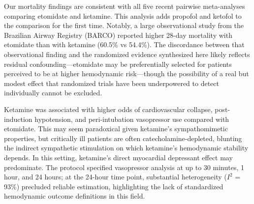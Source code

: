 \documentclass[11pt]{article}
\begin{document}
Our mortality findings are consistent with all five recent pairwise meta-analyses comparing etomidate and ketamine.\cite{kotani2023,koroki2024,greer2025,daghmouri2025,demorais2025} This analysis adds propofol and ketofol to the comparison for the first time. Notably, a large observational study from the Brazilian Airway Registry (BARCO) reported higher 28-day mortality with etomidate than with ketamine (60.5\% vs 54.4\%).\cite{maia2025} The discordance between that observational finding and the randomized evidence synthesized here likely reflects residual confounding---etomidate may be preferentially selected for patients perceived to be at higher hemodynamic risk---though the possibility of a real but modest effect that randomized trials have been underpowered to detect individually cannot be excluded.

Ketamine was associated with higher odds of cardiovascular collapse, post-induction hypotension, and peri-intubation vasopressor use compared with etomidate. This may seem paradoxical given ketamine's sympathomimetic properties, but critically ill patients are often catecholamine-depleted, blunting the indirect sympathetic stimulation on which ketamine's hemodynamic stability depends. In this setting, ketamine's direct myocardial depressant effect may predominate.\cite{waxman1980} The protocol specified vasopressor analysis at up to 30 minutes, 1 hour, and 24 hours; at the 24-hour time point, substantial heterogeneity ($I^2$ = 93\%) precluded reliable estimation, highlighting the lack of standardized hemodynamic outcome definitions in this field.
\end{document}
